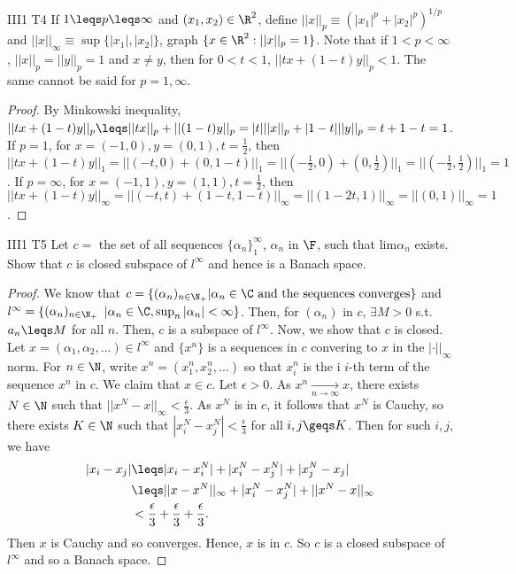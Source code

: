 \begin{exercise}{III1 T4}{}
    If $1\leqs p\leqs \infty$ and $(x_1,x_2)\in\R^2$, 
    define $||x||_p\equiv (|x_1|^p+|x_2|^p)^{1/p}$ and $||x||_{\infty}\equiv \sup\{|x_1|,|x_2|\}$,
    graph $\{x\in\R^2:||x||_p=1\}$. Note that if $1<p<\infty$, $||x||_p=||y||_p=1$ and $x\neq y$, 
    then for $0<t<1$, $||tx+(1-t)y||_p<1$.
    The same cannot be said for $p=1,\infty$.
\end{exercise}

\begin{proof}
    By Minkowski inequality, $||tx+(1-t)y||_p\leqs ||tx||_p+||(1-t)y||_p=|t|||x||_p+|1-t|||y||_p=t+1-t=1$.
    If $p=1$, for $x=(-1,0),y=(0,1),t=\frac{1}{2}$, 
    then $||tx+(1-t)y||_1=||(-t,0)+(0,1-t)||_1=||(-\frac{1}{2},0)+(0,\frac{1}{2})||_1=||(-\frac{1}{2},\frac{1}{2})||_1=1$.
    If $p=\infty$, for $x=(-1,1),y=(1,1),t=\frac{1}{2}$, 
    then $||tx+(1-t)y||_{\infty}=||(-t,t)+(1-t,1-t)||_{\infty}=||(1-2t,1)||_{\infty}=||(0,1)||_{\infty}=1$.
\end{proof}

\begin{exercise}{III1 T5}{}
    Let $c=$ the set of all sequences $\{\alpha_n\}_{1}^{\infty}$, 
    $\alpha_n$ in $\F$, such that lim$\alpha_n$ exists. 
    Show that $c$ is closed subspace of $l^{\infty}$ and hence is a Banach space.
\end{exercise}

\begin{proof}
    We know that $c=\{(\alpha_n)_{n\in \N_+}|\alpha_n\in \C \text{ and the sequences converges}\}$ and 
    $l^{\infty}=\{(\alpha_n)_{n\in\N_+}$ $|\alpha_n\in\C,\sup_{n} |\alpha_n|<\infty\}$.
    Then, for $(\alpha_n)$ in $c$, $\exists M>0$ s.t. $a_n\leqs M$ for all $n$.
    Then, $c$ is a subspace of $l^{\infty}$.
    Now, we show that $c$ is closed.
    Let $x=(\alpha_1,\alpha_2,...)\in l^{\infty}$ and $\{x^n\}$ is a sequences in $c$ convering to $x$ in the $|\cdot||_{\infty}$ norm.
    For $n\in \N$, write $x^{n}=(x_1^n,x_2^n,...)$ so that $x_i^n$ is the  i
    $i$-th term of the sequence $x^n$ in $c$. We claim that $x\in c$.
    Let $\epsilon>0$. As $x^n\underset{n\rightarrow \infty}{\longrightarrow} x$, 
    there exists $N\in \N$ such that $||x^{N}-x||_{\infty}<\frac{\epsilon}{3}$.
    As $x^{N}$ is in $c$, it follows that $x^{N}$ is Cauchy, so there exists $K\in \N$
    such that $|x_i^{N}-x_j^{N}|<\frac{\epsilon}{3}$ for all $i,j\geqs K$. Then for such $i,j$, we have
    \begin{align*}
        |x_i-x_j|&\leqs |x_i-x_i^{N}|+|x_i^N-x_j^N|+|x_j^N-x_j|\\
                &\leqs ||x-x^N||_{\infty}+|x_i^N-x_j^N|+||x^{N}-x||_{\infty}\\
                &<\frac{\epsilon}{3} + \frac{\epsilon}{3} + \frac{\epsilon}{3}.
    \end{align*}
    Then $x$ is Cauchy and so converges. Hence, $x$ is in $c$.
    So $c$ is a closed subspace of $l^{\infty}$ and so a Banach space.
\end{proof}

